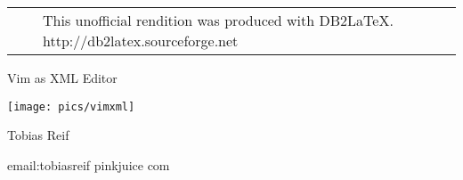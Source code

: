 \thispagestyle{empty}
\begin{tabular*}{\textwidth}{p{7.5cm}lp{5.1cm}}
&
&
\sffamily\small\flushleft
This unofficial rendition was
produced with DB2\LaTeX.
\footnotesize
\mbox{http://db2latex.sourceforge.net}
\end{tabular*}

\begin{center}
\sffamily
\Huge Vim as XML Editor

\texttt{[image: pics/vimxml]}

\Large
Tobias Reif

\normalsize
\ttfamily email:tobiasreif pinkjuice com
\end{center}

